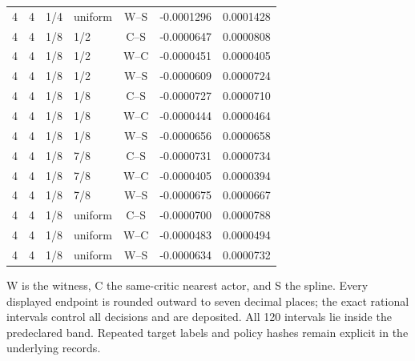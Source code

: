 \begin{longtable}{rrllcrr}
4 & 4 & 1/4 & uniform & W--S & -0.0001296 & 0.0001428 \\
4 & 4 & 1/8 & 1/2 & C--S & -0.0000647 & 0.0000808 \\
4 & 4 & 1/8 & 1/2 & W--C & -0.0000451 & 0.0000405 \\
4 & 4 & 1/8 & 1/2 & W--S & -0.0000609 & 0.0000724 \\
4 & 4 & 1/8 & 1/8 & C--S & -0.0000727 & 0.0000710 \\
4 & 4 & 1/8 & 1/8 & W--C & -0.0000444 & 0.0000464 \\
4 & 4 & 1/8 & 1/8 & W--S & -0.0000656 & 0.0000658 \\
4 & 4 & 1/8 & 7/8 & C--S & -0.0000731 & 0.0000734 \\
4 & 4 & 1/8 & 7/8 & W--C & -0.0000405 & 0.0000394 \\
4 & 4 & 1/8 & 7/8 & W--S & -0.0000675 & 0.0000667 \\
4 & 4 & 1/8 & uniform & C--S & -0.0000700 & 0.0000788 \\
4 & 4 & 1/8 & uniform & W--C & -0.0000483 & 0.0000494 \\
4 & 4 & 1/8 & uniform & W--S & -0.0000634 & 0.0000732 \\
\end{longtable}
W is the witness, C the same-critic nearest actor, and S the spline. Every displayed endpoint is rounded outward to seven decimal places; the exact rational intervals control all decisions and are deposited. All 120 intervals lie inside the predeclared band. Repeated target labels and policy hashes remain explicit in the underlying records.

